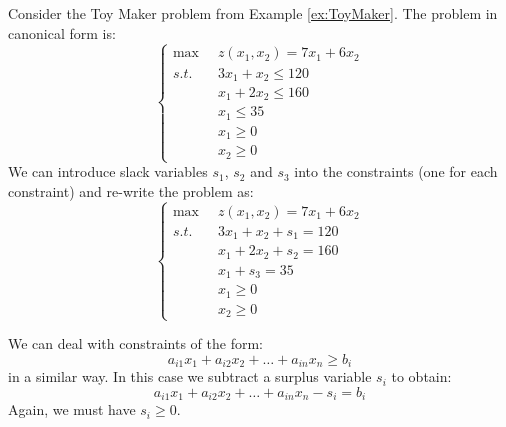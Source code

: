 \begin{example} Consider the Toy Maker problem from Example \ref{ex:ToyMaker}. The problem in canonical form is:
\begin{displaymath}
\left\{
\begin{aligned}
\max\;\;& z(x_1,x_2) = 7x_1 + 6x_2\\
s.t.\;\;&  3x_1 + x_2 \leq 120\\
& x_1 + 2x_2 \leq 160\\
& x_1 \leq 35\\
& x_1 \geq 0\\
& x_2 \geq 0
\end{aligned}
\right.
\end{displaymath}
We can introduce slack variables $s_1$, $s_2$ and $s_3$ into the constraints (one for each constraint) and re-write the problem as:
\begin{displaymath}
\left\{
\begin{aligned}
\max\;\;& z(x_1,x_2) = 7x_1 + 6x_2\\
s.t.\;\;&  3x_1 + x_2 + s_1 = 120\\
& x_1 + 2x_2 + s_2 = 160\\
& x_1 + s_3 = 35\\
& x_1 \geq 0\\
& x_2 \geq 0
\end{aligned}
\right.
\end{displaymath}
\label{ex:ToyMakerStandard}
\end{example}

\begin{remark}
We can deal with constraints of the form:
\begin{equation}
a_{i1}x_1 + a_{i2}x_2 + \dots + a_{in}x_n \geq b_i
\label{eqn:GTConstraint}
\end{equation}
in a similar way. In this case we subtract a surplus variable $s_i$ to obtain:
\begin{displaymath}
a_{i1}x_1 + a_{i2}x_2 + \dots + a_{in}x_n - s_i = b_i
\end{displaymath}
Again, we must have $s_i \geq 0$. 
\end{remark}


